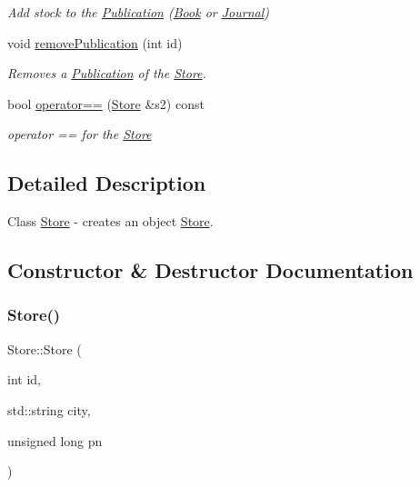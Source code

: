 \begin{DoxyCompactItemize}
$$\begin{DoxyCompactList}\small\item\em Add stock to the \hyperlink{class_publication}{Publication} (\hyperlink{class_book}{Book} or \hyperlink{class_journal}{Journal}) \end{DoxyCompactList}\item 
void \hyperlink{class_store_a64f322bc111e0e88ab0995cd86718f0d}{remove\+Publication} (int id)
\begin{DoxyCompactList}\small\item\em Removes a \hyperlink{class_publication}{Publication} of the \hyperlink{class_store}{Store}. \end{DoxyCompactList}\item 
bool \hyperlink{class_store_a4dfd27a0615f161f2f0e94297bb54969}{operator==} (\hyperlink{class_store}{Store} \&s2) const
\begin{DoxyCompactList}\small\item\em operator == for the \hyperlink{class_store}{Store} \end{DoxyCompactList}\end{DoxyCompactItemize}


\subsection{Detailed Description}
Class \hyperlink{class_store}{Store} -\/ creates an object \hyperlink{class_store}{Store}. 

\subsection{Constructor \& Destructor Documentation}
\mbox{\label{class_store_a7e67d8e31c81dd0ae4a8fa5a397a40df}} 
\subsubsection{\texorpdfstring{Store()}{Store()}}
{\footnotesize\ttfamily Store\+::\+Store (\begin{DoxyParamCaption}\item[{int}]{id,  }\item[{std\+::string}]{city,  }\item[{unsigned long}]{pn }\end{DoxyParamCaption})}



